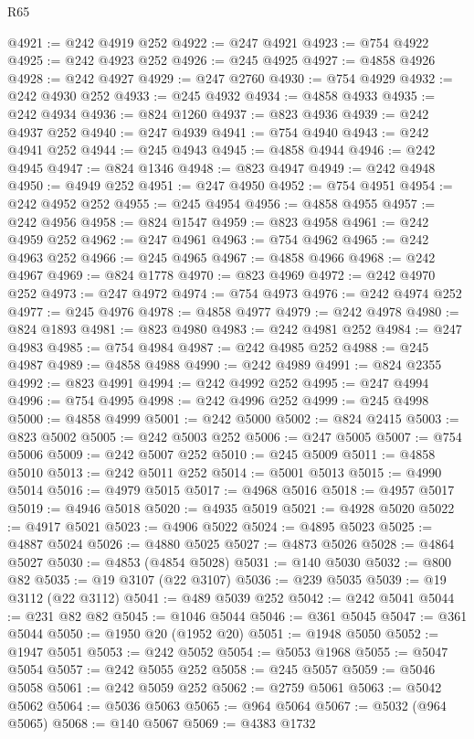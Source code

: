 \begin{lexlean}{R65}
\begin{coremodule}
{@4921 := @242 @4919 @252
@4922 := @247 @4921
@4923 := @754 @4922
@4925 := @242 @4923 @252
@4926 := @245 @4925
@4927 := @4858 @4926
@4928 := @242 @4927
@4929 := @247 @2760
@4930 := @754 @4929
@4932 := @242 @4930 @252
@4933 := @245 @4932
@4934 := @4858 @4933
@4935 := @242 @4934
@4936 := @824 @1260
@4937 := @823 @4936
@4939 := @242 @4937 @252
@4940 := @247 @4939
@4941 := @754 @4940
@4943 := @242 @4941 @252
@4944 := @245 @4943
@4945 := @4858 @4944
@4946 := @242 @4945
@4947 := @824 @1346
@4948 := @823 @4947
@4949 := @242 @4948
@4950 := @4949 @252
@4951 := @247 @4950
@4952 := @754 @4951
@4954 := @242 @4952 @252
@4955 := @245 @4954
@4956 := @4858 @4955
@4957 := @242 @4956
@4958 := @824 @1547
@4959 := @823 @4958
@4961 := @242 @4959 @252
@4962 := @247 @4961
@4963 := @754 @4962
@4965 := @242 @4963 @252
@4966 := @245 @4965
@4967 := @4858 @4966
@4968 := @242 @4967
@4969 := @824 @1778
@4970 := @823 @4969
@4972 := @242 @4970 @252
@4973 := @247 @4972
@4974 := @754 @4973
@4976 := @242 @4974 @252
@4977 := @245 @4976
@4978 := @4858 @4977
@4979 := @242 @4978
@4980 := @824 @1893
@4981 := @823 @4980
@4983 := @242 @4981 @252
@4984 := @247 @4983
@4985 := @754 @4984
@4987 := @242 @4985 @252
@4988 := @245 @4987
@4989 := @4858 @4988
@4990 := @242 @4989
@4991 := @824 @2355
@4992 := @823 @4991
@4994 := @242 @4992 @252
@4995 := @247 @4994
@4996 := @754 @4995
@4998 := @242 @4996 @252
@4999 := @245 @4998
@5000 := @4858 @4999
@5001 := @242 @5000
@5002 := @824 @2415
@5003 := @823 @5002
@5005 := @242 @5003 @252
@5006 := @247 @5005
@5007 := @754 @5006
@5009 := @242 @5007 @252
@5010 := @245 @5009
@5011 := @4858 @5010
@5013 := @242 @5011 @252
@5014 := @5001 @5013
@5015 := @4990 @5014
@5016 := @4979 @5015
@5017 := @4968 @5016
@5018 := @4957 @5017
@5019 := @4946 @5018
@5020 := @4935 @5019
@5021 := @4928 @5020
@5022 := @4917 @5021
@5023 := @4906 @5022
@5024 := @4895 @5023
@5025 := @4887 @5024
@5026 := @4880 @5025
@5027 := @4873 @5026
@5028 := @4864 @5027
@5030 := @4853 (@4854 @5028)
@5031 := @140 @5030
@5032 := @800 @82
@5035 := @19 @3107 (@22 @3107)
@5036 := @239 @5035
@5039 := @19 @3112 (@22 @3112)
@5041 := @489 @5039 @252
@5042 := @242 @5041
@5044 := @231 @82 @82
@5045 := @1046 @5044
@5046 := @361 @5045
@5047 := @361 @5044
@5050 := @1950 @20 (@1952 @20)
@5051 := @1948 @5050
@5052 := @1947 @5051
@5053 := @242 @5052
@5054 := @5053 @1968
@5055 := @5047 @5054
@5057 := @242 @5055 @252
@5058 := @245 @5057
@5059 := @5046 @5058
@5061 := @242 @5059 @252
@5062 := @2759 @5061
@5063 := @5042 @5062
@5064 := @5036 @5063
@5065 := @964 @5064
@5067 := @5032 (@964 @5065)
@5068 := @140 @5067
@5069 := @4383 @1732
}
\end{coremodule}
\end{lexlean}
